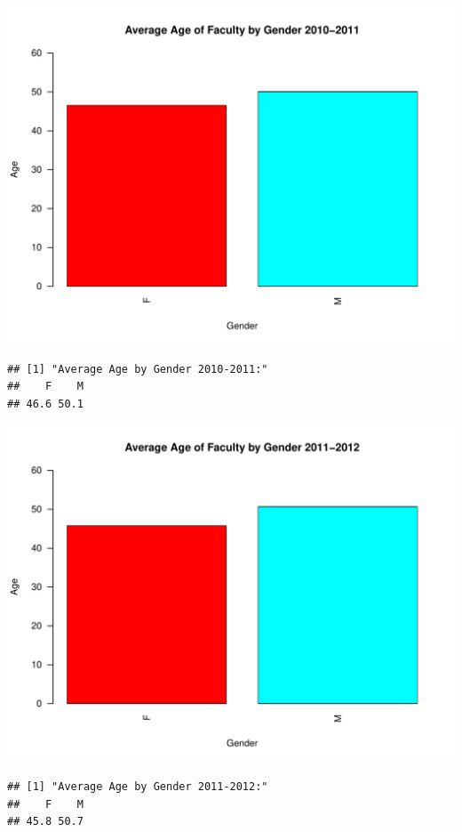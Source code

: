 \documentclass[12pt,a4paper]{article}\usepackage[]{graphicx}\usepackage[]{color}
\makeatletter
\def\maxwidth{ %
  \ifdim\Gin@nat@width>\linewidth
    \linewidth
  \else
    \Gin@nat@width
  \fi
}
\newenvironment{kframe}{%
 \def\at@end@of@kframe{}%
 \ifinner\ifhmode%
  \def\at@end@of@kframe{\end{minipage}}%
  \begin{minipage}{\columnwidth}%
 \fi\fi%
 \def\FrameCommand##1{\hskip\@totalleftmargin \hskip-\fboxsep
 \colorbox{shadecolor}{##1}\hskip-\fboxsep
     \hskip-\linewidth \hskip-\@totalleftmargin \hskip\columnwidth}%
 \MakeFramed {\advance\hsize-\width
   \@totalleftmargin\z@ \linewidth\hsize
   \@setminipage}}%
 {\par\unskip\endMakeFramed%
 \at@end@of@kframe}
\newenvironment{knitrout}{}{} %
\theoremstyle{definition}
\makeatother
\begin{document}
\begin{knitrout}
\includegraphics[width=\maxwidth]{figure/unnamed-chunk-11-7} 
\begin{kframe}\begin{verbatim}
## [1] "Average Age by Gender 2010-2011:"
##    F    M 
## 46.6 50.1
\end{verbatim}
\end{kframe}
\includegraphics[width=\maxwidth]{figure/unnamed-chunk-11-8} 
\begin{kframe}\begin{verbatim}
## [1] "Average Age by Gender 2011-2012:"
##    F    M 
## 45.8 50.7
\end{verbatim}
\end{kframe}

\end{knitrout}
\end{document}
